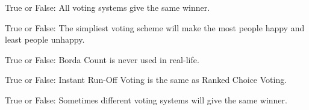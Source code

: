 \documentclass[nooutcomes,noauthor]{ximera}
\author{Bart Snapp}
\begin{document}
\maketitle



\begin{exercise}
  True or False: All voting systems give the same winner.
 
\end{exercise}




\begin{exercise}
  True or False: The simpliest voting scheme will make the most people
  happy and least people unhappy.
\end{exercise}




\begin{exercise}
  True or False: Borda Count is never used in real-life.
\end{exercise}



\begin{exercise}
  True or False: Instant Run-Off Voting is the same as Ranked Choice Voting.
\end{exercise}




\begin{exercise}
  True or False: Sometimes different voting systems will give the same
  winner.
\end{exercise}



\end{document}

